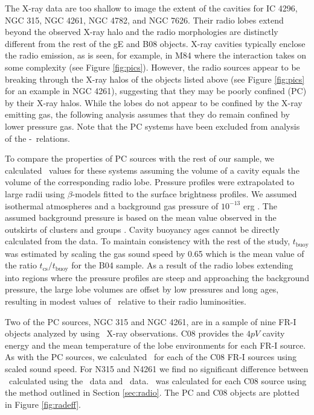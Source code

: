 \documentclass[12pt, preprint]{aastex}
\begin{document}
The X-ray data are too shallow to image the extent of the cavities for
IC 4296, NGC 315, NGC 4261, NGC 4782, and NGC 7626. Their radio lobes
extend beyond the observed X-ray halo and the radio morphologies are
distinctly different from the rest of the gE and B08 objects. X-ray
cavities typically enclose the radio emission, as is seen, for
example, in M84 \citep{2001ApJ...547L.107F, 2008ApJ...686..911F} where
the interaction takes on some complexity (see Figure
\ref{fig:pics}). However, the radio sources appear to be breaking
through the X-ray halos of the objects listed above (see Figure
\ref{fig:pics} for an example in NGC 4261), suggesting that they may
be poorly confined (PC) by their X-ray halos. While the lobes do not
appear to be confined by the X-ray emitting gas, the following
analysis assumes that they do remain confined by lower pressure
gas. Note that the PC systems have been excluded from analysis of the
\pjet-\prad\ relations.

To compare the properties of PC sources with the rest of our sample,
we calculated \pcav\ values for these systems assuming the volume of a
cavity equals the volume of the corresponding radio lobe. Pressure
profiles were extrapolated to large radii using $\beta$-models
\citep{betamodel} fitted to the surface brightness profiles. We
assumed isothermal atmospheres and a background gas pressure of
$10^{-13}$ erg \pcc. The assumed background pressure is based on the
mean value observed in the outskirts of clusters and groups
\citep{accept}. Cavity buoyancy ages cannot be directly calculated
from the data. To maintain consistency with the rest of the study,
$t_{\mathrm{buoy}}$ was estimated by scaling the gas sound speed by
0.65 which is the mean value of the ratio
$t_{\mathrm{cs}}/t_{\mathrm{buoy}}$ for the B04 sample. As a result of
the radio lobes extending into regions where the pressure profiles are
steep and approaching the background pressure, the large lobe volumes
are offset by low pressures and long ages, resulting in modest values
of \pcav\ relative to their radio luminosities.

Two of the PC sources, NGC 315 and NGC 4261, are in a sample of nine
FR-I objects analyzed by \citet[][hereafter C08]{2008MNRAS.386.1709C}
using \xmm\ X-ray observations. C08 provides the $4pV$ cavity energy
and the mean temperature of the lobe environments for each FR-I
source. As with the PC sources, we calculated \pcav\ for each of the
C08 FR-I sources using scaled sound speed. For N315 and N4261 we find
no significant difference between \pcav\ calculated using the
\chandra\ data and \xmm\ data. \phigh\ was calculated for each C08
source using the method outlined in Section \ref{sec:radio}. The PC
and C08 objects are plotted in Figure \ref{fig:radeff}.
\end{document}
